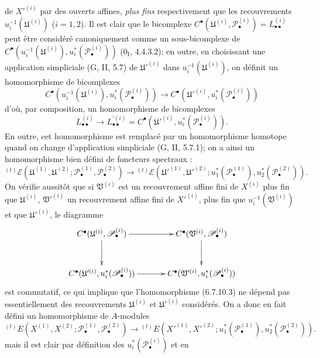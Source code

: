 \begin{env}[6.7.10]
de $X'^{(i)}$ par des ouverts affines, \emph{plus fins} respectivement que les
recouvrements $u_i^{-1}(\mathfrak U^{(i)})$ ($i=1,2$). Il est clair que le
bicomplexe
$C^\bullet(\mathfrak U^{(i)},\mathscr P_\bullet^{(i)})
=L_{\bullet\bullet}^{(i)}$ peut être considéré canoniquement comme un
sous-bicomplexe de
$C^\bullet(u_i^{-1}(\mathfrak U^{(i)}),u_i^*(\mathscr P_\bullet^{(i)}))$
($0_{\mathrm I}$, 4.4.3.2); en outre, en choisissant une application
simpliciale (G, II, 5.7) de $\mathfrak U'^{(i)}$ dans
$u_i^{-1}(\mathfrak U^{(i)})$, on définit un homomorphisme de bicomplexes
\[
  C^\bullet(u_i^{-1}(\mathfrak U^{(i)}),u_i^*(\mathscr P_\bullet^{(i)}))
  \longrightarrow
  C^\bullet(\mathfrak U'^{(i)},u_i^*(\mathscr P_\bullet^{(i)}))
\]
d'où, par composition, un homomorphisme de bicomplexes
\[
  L_{\bullet\bullet}^{(i)}
  \longrightarrow
  L_{\bullet\bullet}^{\prime(i)}
  =C^\bullet(\mathfrak U'^{(i)},u_i^*(\mathscr P_\bullet^{(i)})).
\]
En outre, cet homomorphisme est remplacé par un homomorphisme homotope quand
on change d'application simpliciale (G, II, 5.7.1); on a ainsi un
homomorphisme bien défini de foncteurs spectraux :
\[
  {}^{(t)}\mathscr E
  (\mathfrak U^{(1)},\mathfrak U^{(2)};
   \mathscr P_\bullet^{(1)},\mathscr P_\bullet^{(2)})
  \longrightarrow
  {}^{(t)}\mathscr E
  (\mathfrak U'^{(1)},\mathfrak U'^{(2)};
   u_1^*(\mathscr P_\bullet^{(1)}),u_2^*(\mathscr P_\bullet^{(2)})).
  \tag{6.7.10.3}\label{III.6.7.10.3.fr}
\]
On vérifie aussitôt que si $\mathfrak V^{(i)}$ est un recouvrement affine
fini de $X^{(i)}$ plus fin que $\mathfrak U^{(i)}$,
$\mathfrak V'^{(i)}$ un recouvrement affine fini de $X'^{(i)}$, plus fin que
$u_i^{-1}(\mathfrak V^{(i)})$ et que $\mathfrak U'^{(i)}$, le diagramme
\[
\xymatrix@C=34pt@R=30pt{
  C^\bullet(\mathfrak U^{(i)},\mathscr P_\bullet^{(i)})
  \ar[r]\ar[d]
  & C^\bullet(\mathfrak V^{(i)},\mathscr P_\bullet^{(i)})\ar[d]
  \\
  C^\bullet(\mathfrak U'^{(i)},u_i^*(\mathscr P_\bullet^{(i)}))
  \ar[r]
  & C^\bullet(\mathfrak V'^{(i)},u_i^*(\mathscr P_\bullet^{(i)}))
}
\]
est commutatif, ce qui implique que l'homomorphisme (6.7.10.3) ne dépend pas
essentiellement des recouvrements $\mathfrak U^{(i)}$ et
$\mathfrak U'^{(i)}$ considérés. On a donc en fait défini un homomorphisme de
$A$-modules
\[
  {}^{(t)}E
  (X^{(1)},X^{(2)};\mathscr P_\bullet^{(1)},\mathscr P_\bullet^{(2)})
  \longrightarrow
  {}^{(t)}E
  (X'^{(1)},X'^{(2)};
   u_1^*(\mathscr P_\bullet^{(1)}),u_2^*(\mathscr P_\bullet^{(2)})).
  \tag{6.7.10.4}\label{III.6.7.10.4.fr}
\]
mais il est clair par définition des $u_i^*(\mathscr P_\bullet^{(i)})$ et en

\end{env}

